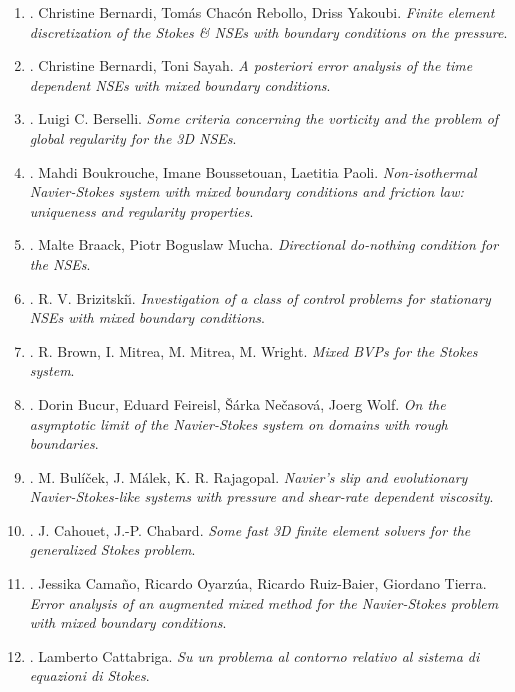 \documentclass{article}
\begin{document}
\begin{enumerate}
	\item \cite{Bernardi_Rebollo_Yakoubi2015}. {\sc Christine Bernardi, Tom\'{a}s Chac\'{o}n Rebollo, Driss Yakoubi}. {\it Finite element discretization of the Stokes \& NSEs with boundary conditions on the pressure}.
	\item \cite{Bernardi_Rebollo_Yakoubi2015}. {\sc Christine Bernardi, Toni Sayah}. {\it A posteriori error analysis of the time dependent NSEs with mixed boundary conditions}.
	\item \cite{Berselli2009}. {\sc Luigi C. Berselli}. {\it Some criteria concerning the vorticity and the problem of global regularity for the 3D NSEs}.
	\item \cite{Boukrouche_Boussetouan_Paoli2014}. {\sc Mahdi Boukrouche, Imane Boussetouan, Laetitia Paoli}. {\it Non-isothermal Navier-Stokes system with mixed boundary conditions and friction law: uniqueness and regularity properties}.
	\item \cite{Braack_Mucha2014}. {\sc Malte Braack, Piotr Boguslaw Mucha}. {\it Directional do-nothing condition for the NSEs}.
	\item \cite{Brizitskii2009}. {\sc R. V. Brizitski\u{\i}}. {\it Investigation of a class of control problems for stationary NSEs with mixed boundary conditions}.
	\item \cite{Brown_Mitrea_Mitrea_Wright2010}. {\sc R. Brown, I. Mitrea, M. Mitrea, M. Wright}. {\it Mixed BVPs for the Stokes system}.
	\item \cite{Bucur_Feireisl_Necasova_Wolf2008}. {\sc Dorin Bucur, Eduard Feireisl, \v{S}\'{a}rka Ne\v{c}asov\'{a}, Joerg Wolf}. {\it On the asymptotic limit of the Navier-Stokes system on domains with rough boundaries}.
	\item \cite{Bulicek_Malek_Rajagopal2007}. {\sc M. Bul\'{i}\v{c}ek, J. M\'{a}lek, K. R. Rajagopal}. {\it Navier's slip and evolutionary {N}avier-{S}tokes-like systems with pressure and shear-rate dependent viscosity}.
	\item \cite{Cahouet_Chabard1988}. {\sc J. Cahouet, J.-P. Chabard}. {\it Some fast 3D finite element solvers for the generalized Stokes problem}.
	\item \cite{Camano_Oyarzua_Ruiz-Baier_Tierra2018}. {\sc Jessika Cama\~{n}o, Ricardo Oyarz\'{u}a,  Ricardo Ruiz-Baier, Giordano Tierra}. {\it Error analysis of an augmented mixed method for the Navier-Stokes problem with mixed boundary conditions}.
	\item \cite{Cattabriga1961}. {\sc Lamberto Cattabriga}. {\it Su un problema al contorno relativo al sistema di equazioni di Stokes}.

\end{enumerate}
\end{document}
